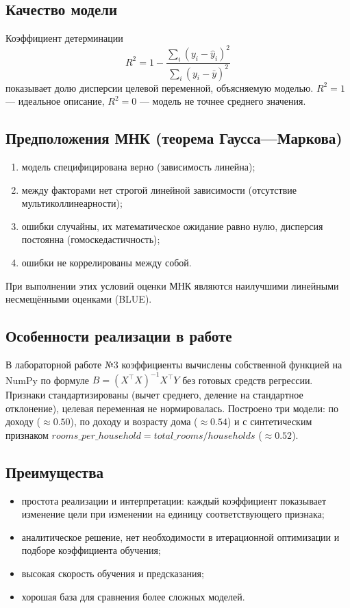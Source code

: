 \documentclass[12pt,a4paper]{article}
\begin{document}
\subsection{Качество модели}
Коэффициент детерминации
\begin{equation}
R^2 = 1 - \frac{\sum_i (y_i - \hat{y}_i)^2}{\sum_i (y_i - \bar{y})^2}
\end{equation}
показывает долю дисперсии целевой переменной, объясняемую моделью. $R^2 = 1$ --- идеальное описание, $R^2 = 0$ --- модель не точнее среднего значения.

\subsection{Предположения МНК (теорема Гаусса---Маркова)}
\begin{enumerate}
\item модель специфицирована верно (зависимость линейна);
\item между факторами нет строгой линейной зависимости (отсутствие мультиколлинеарности);
\item ошибки случайны, их математическое ожидание равно нулю, дисперсия постоянна (гомоскедастичность);
\item ошибки не коррелированы между собой.
\end{enumerate}
При выполнении этих условий оценки МНК являются наилучшими линейными несмещёнными оценками (BLUE).

\subsection{Особенности реализации в работе}
В лабораторной работе №3 коэффициенты вычислены собственной функцией на NumPy по формуле $B=(X^\top X)^{-1}X^\top Y$ без готовых средств регрессии. Признаки стандартизированы (вычет среднего, деление на стандартное отклонение), целевая переменная не нормировалась. Построено три модели: по доходу ($\approx 0.50$), по доходу и возрасту дома ($\approx 0.54$) и с синтетическим признаком $rooms\_per\_household = total\_rooms / households$ ($\approx 0.52$).

\subsection{Преимущества}
\begin{itemize}
\item простота реализации и интерпретации: каждый коэффициент показывает изменение цели при изменении на единицу соответствующего признака;
\item аналитическое решение, нет необходимости в итерационной оптимизации и подборе коэффициента обучения;
\item высокая скорость обучения и предсказания;
\item хорошая база для сравнения более сложных моделей.
\end{itemize}
\end{document}
